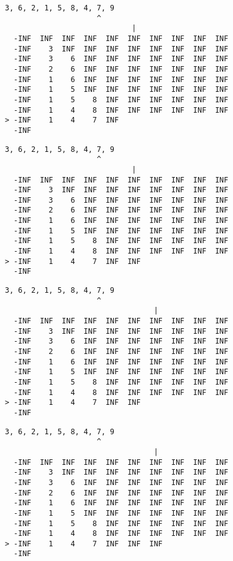 { \begin{verbatim}
3, 6, 2, 1, 5, 8, 4, 7, 9
                     ^
                             |
  -INF  INF  INF  INF  INF  INF  INF  INF  INF  INF
  -INF    3  INF  INF  INF  INF  INF  INF  INF  INF
  -INF    3    6  INF  INF  INF  INF  INF  INF  INF
  -INF    2    6  INF  INF  INF  INF  INF  INF  INF
  -INF    1    6  INF  INF  INF  INF  INF  INF  INF
  -INF    1    5  INF  INF  INF  INF  INF  INF  INF
  -INF    1    5    8  INF  INF  INF  INF  INF  INF
  -INF    1    4    8  INF  INF  INF  INF  INF  INF
> -INF    1    4    7  INF                         
  -INF                                             
\end{verbatim} }

{ \begin{verbatim}
3, 6, 2, 1, 5, 8, 4, 7, 9
                     ^
                             |
  -INF  INF  INF  INF  INF  INF  INF  INF  INF  INF
  -INF    3  INF  INF  INF  INF  INF  INF  INF  INF
  -INF    3    6  INF  INF  INF  INF  INF  INF  INF
  -INF    2    6  INF  INF  INF  INF  INF  INF  INF
  -INF    1    6  INF  INF  INF  INF  INF  INF  INF
  -INF    1    5  INF  INF  INF  INF  INF  INF  INF
  -INF    1    5    8  INF  INF  INF  INF  INF  INF
  -INF    1    4    8  INF  INF  INF  INF  INF  INF
> -INF    1    4    7  INF  INF                    
  -INF                                             
\end{verbatim} }

{ \begin{verbatim}
3, 6, 2, 1, 5, 8, 4, 7, 9
                     ^
                                  |
  -INF  INF  INF  INF  INF  INF  INF  INF  INF  INF
  -INF    3  INF  INF  INF  INF  INF  INF  INF  INF
  -INF    3    6  INF  INF  INF  INF  INF  INF  INF
  -INF    2    6  INF  INF  INF  INF  INF  INF  INF
  -INF    1    6  INF  INF  INF  INF  INF  INF  INF
  -INF    1    5  INF  INF  INF  INF  INF  INF  INF
  -INF    1    5    8  INF  INF  INF  INF  INF  INF
  -INF    1    4    8  INF  INF  INF  INF  INF  INF
> -INF    1    4    7  INF  INF                    
  -INF                                             
\end{verbatim} }

{ \begin{verbatim}
3, 6, 2, 1, 5, 8, 4, 7, 9
                     ^
                                  |
  -INF  INF  INF  INF  INF  INF  INF  INF  INF  INF
  -INF    3  INF  INF  INF  INF  INF  INF  INF  INF
  -INF    3    6  INF  INF  INF  INF  INF  INF  INF
  -INF    2    6  INF  INF  INF  INF  INF  INF  INF
  -INF    1    6  INF  INF  INF  INF  INF  INF  INF
  -INF    1    5  INF  INF  INF  INF  INF  INF  INF
  -INF    1    5    8  INF  INF  INF  INF  INF  INF
  -INF    1    4    8  INF  INF  INF  INF  INF  INF
> -INF    1    4    7  INF  INF  INF               
  -INF                                             
\end{verbatim} }

